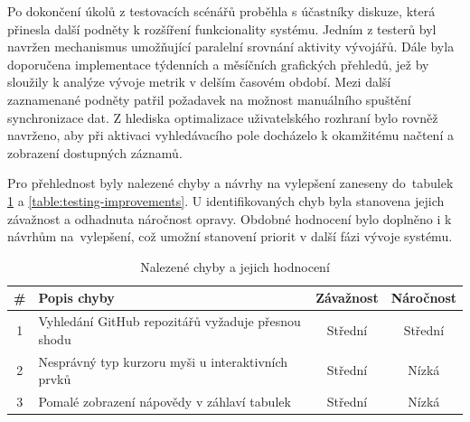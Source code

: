 Po dokončení úkolů z testovacích scénářů proběhla s účastníky diskuze, která přinesla další podněty k rozšíření funkcionality systému. Jedním z testerů byl navržen mechanismus umožňující paralelní srovnání aktivity vývojářů. Dále byla doporučena implementace týdenních a měsíčních grafických přehledů, jež by sloužily k analýze vývoje metrik v delším časovém období. Mezi další zaznamenané podněty patřil požadavek na možnost manuálního spuštění synchronizace dat. Z hlediska optimalizace uživatelského rozhraní bylo rovněž navrženo, aby při aktivaci vyhledávacího pole docházelo k okamžitému načtení a zobrazení dostupných záznamů.

Pro přehlednost byly nalezené chyby a návrhy na vylepšení zaneseny do~tabulek \ref{table:testing-errors} a \ref{table:testing-improvements}. U identifikovaných chyb byla stanovena jejich závažnost a odhadnuta náročnost opravy. Obdobné hodnocení bylo doplněno i k návrhům na~vylepšení, což umožní stanovení priorit v další fázi vývoje systému.

\begin{table}[h]
    \centering
    \caption{Nalezené chyby a jejich hodnocení}
    \label{table:testing-errors}
    \begin{tabularx}{\textwidth}{|c|X|c|c|}
    \hline
    \# & Popis chyby                                        & Závažnost & Náročnost \\ \hline\hline
    1  & Vyhledání GitHub repozitářů vyžaduje přesnou shodu & Střední   & Střední   \\ \hline
    2  & Nesprávný typ kurzoru myši u interaktivních prvků  & Střední   & Nízká     \\ \hline
    3  & Pomalé zobrazení nápovědy v záhlaví tabulek        & Střední   & Nízká     \\ \hline
    \end{tabularx}
\end{table}

